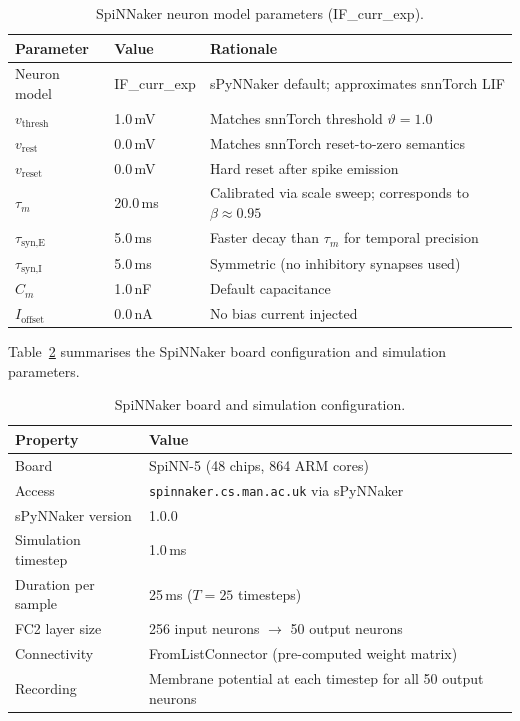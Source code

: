 \begin{table}[H]
\centering
\caption{SpiNNaker neuron model parameters (IF\_curr\_exp).}
\label{tab:spinnaker-neuron}
\small
\begin{tabular}{llp{8cm}}
\toprule
\textbf{Parameter} & \textbf{Value} & \textbf{Rationale} \\
\midrule
Neuron model       & IF\_curr\_exp       & sPyNNaker default; approximates snnTorch LIF \\
$v_\text{thresh}$  & 1.0\,mV            & Matches snnTorch threshold $\vartheta = 1.0$ \\
$v_\text{rest}$    & 0.0\,mV            & Matches snnTorch reset-to-zero semantics \\
$v_\text{reset}$   & 0.0\,mV            & Hard reset after spike emission \\
$\tau_m$           & 20.0\,ms           & Calibrated via scale sweep; corresponds to $\beta \approx 0.95$ \\
$\tau_\text{syn,E}$& 5.0\,ms            & Faster decay than $\tau_m$ for temporal precision \\
$\tau_\text{syn,I}$& 5.0\,ms            & Symmetric (no inhibitory synapses used) \\
$C_m$              & 1.0\,nF            & Default capacitance \\
$I_\text{offset}$  & 0.0\,nA            & No bias current injected \\
\bottomrule
\end{tabular}
\end{table}

Table~\ref{tab:spinnaker-board} summarises the SpiNNaker board configuration and simulation parameters.

\begin{table}[H]
\centering
\caption{SpiNNaker board and simulation configuration.}
\label{tab:spinnaker-board}
\small
\begin{tabular}{ll}
\toprule
\textbf{Property} & \textbf{Value} \\
\midrule
Board              & SpiNN-5 (48 chips, 864 ARM cores) \\
Access             & \texttt{spinnaker.cs.man.ac.uk} via sPyNNaker \\
sPyNNaker version  & 1.0.0 \\
Simulation timestep& 1.0\,ms \\
Duration per sample& 25\,ms ($T = 25$ timesteps) \\
FC2 layer size     & 256 input neurons $\to$ 50 output neurons \\
Connectivity       & FromListConnector (pre-computed weight matrix) \\
Recording          & Membrane potential at each timestep for all 50 output neurons \\
\bottomrule
\end{tabular}
\end{table}

